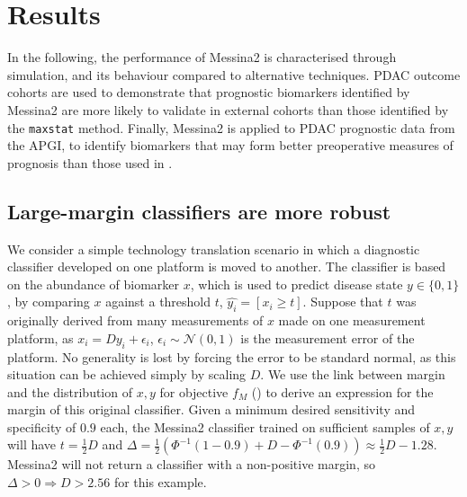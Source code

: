 \documentclass[dissertation.tex]{subfiles}
\begin{document}
\section{Results}
In the following, the performance of Messina2 is characterised through simulation, and its behaviour compared to alternative techniques.  \gls{PDAC} outcome cohorts are used to demonstrate that prognostic biomarkers identified by Messina2 are more likely to validate in external cohorts than those identified by the \texttt{maxstat} method.  Finally, Messina2 is applied to \gls{PDAC} prognostic data from the \gls{APGI}, to identify biomarkers that may form better preoperative measures of prognosis than those used in .

\subsection{Large-margin classifiers are more robust}
We consider a simple technology translation scenario in which a diagnostic classifier developed on one platform is moved to another.  The classifier is based on the abundance of biomarker $x$, which is used to predict disease state $y \in \{0, 1\}$, by comparing $x$ against a threshold $t$, $\hat{y_i} = [x_i \geq t]$.  Suppose that $t$ was originally derived from many measurements of $x$ made on one measurement platform, as $x_i = D y_i + \epsilon_i$, $\epsilon_i \sim \mathcal{N}(0, 1)$ is the measurement error of the platform.  No generality is lost by forcing the error to be standard normal, as this situation can be achieved simply by scaling $D$.  We use the link between margin and the distribution of $x, y$ for objective $f_M$ () to derive an expression for the margin of this original classifier.  Given a minimum desired sensitivity and specificity of $0.9$ each, the Messina2 classifier trained on sufficient samples of $x, y$ will have $t = \frac{1}{2}D$ and $\Delta = \frac{1}{2}(\Phi^{-1}(1-0.9)+D-\Phi^{-1}(0.9)) \approx \frac{1}{2}D - 1.28$.  Messina2 will not return a classifier with a non-positive margin, so $\Delta > 0 \Rightarrow D > 2.56$ for this example.
\end{document}
